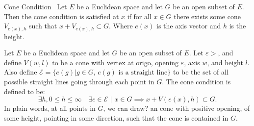 \begin{defn}{Cone Condition}~\label{def:cone_condition}
    Let $E$ be a Euclidean space and let $G$ be an open subset of $E$.
     Then the cone condition is satisfied at $x$ if for all $x\in G$ there exists some cone $V_{e(x),h}$ such that $x+V_{e(x),h}\subset G$.
    Where $e(x)$ is the axis vector and $h$ is the height. 

    
    Let $E$ be a Euclidean space and let $G$ be an open subset of $E$.
    Let $\varepsilon >$, and define 
    $V(w, l)$ to be a cone with vertex at origo, opening $\varepsilon$, axis $w$,
    and height $l$.
    Also define $\mathcal{E} = \{e(g) | g \in G, \, e(g) \text{ is a straight line}\}$ 
    to be the set of all possible straight lines going through each point in $G$. %
    The cone condition is defined to be:
    \begin{equation*}
        \exists h, 0\leq h \leq \infty \quad
        \exists e\in \mathcal{E} \,\, | \,\,  x \in G \implies 
        x + V(e(x), h) \subset G.
    \end{equation*}
    In plain words, at all points in $G$, we can draw? an cone with positive opening,
    of some height, pointing in some direction, such that the cone is contained 
    in $G$.
\end{defn}

\begin{figure}[H]
    \center
    
    
\end{figure}
